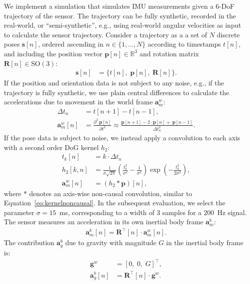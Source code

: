 \documentclass[journal]{IEEEtran}
\renewcommand{\vec}[1]{\boldsymbol{#1}}
\begin{document}
We implement a simulation that simulates IMU measurements given a 6-DoF trajectory of the sensor.
The trajectory can be fully synthetic, recorded in the real-world, or ``semi-synthetic'', e.g., using real-world angular velocities as input to calculate the sensor trajectory.   
Consider a trajectory as a a set of $N$ discrete poses $\vec{s}[n]$, ordered ascending in $n \in \lbrace 1,\dots,N \rbrace$ according to timestamps $t[n]$, and including the position vector $\vec{p}[n] \in \mathbb{R}^3$ and rotation matrix $\mathbf{R}[n] \in \text{SO}(3)$:
\begin{align}
\mathbf{s}[n] &= \lbrace t[n],\; \vec{p}[n],\; \mathbf{R}[n] \rbrace.
\end{align}
If the position and orientation data is not subject to any noise, e.g., if the trajectory is fully synthetic, we use plain central differences to calculate the accelerations due to movement in the world frame $\vec{a}_{m}^{w}$:
\begin{align}
  \Delta t_n &= t[n+1] - t[n-1], \\
  \vec{a}^w_m[n] &= \frac{\partial^2\,\vec{p}[n]}{\partial t^2} \approx \frac{\vec{p}[n+1] - 2 \cdot \vec{p}[n] +\; \vec{p}[n-1]}{\Delta t_{n}^2}.
\end{align}
If the pose data is subject to noise, we instead apply a convolution to each axis with a second order DoG kernel $h_2$:
\begin{align}
t_k[n] &= k \cdot \Delta t_n \\
h_2[k, n] &= \frac{1}{\sigma \sqrt{2\pi}} \left( \frac{t_k^2}{\sigma^4} - \frac{1}{\sigma^2} \right) \exp\!\left( - \frac{t_k^2}{2\sigma^2} \right), \\
\vec{a}^w_{m}[n] &= (h_2 * \vec{p})[n], \label{eq:awm}
\end{align}
where $*$ denotes an axis-wise non-causal convolution, similar to Equation~\eqref{eq:kernelnoncausal}.
In the subsequent evaluation, we select the parameter $\sigma = 15$~ms, corresponding to a width of 3 samples for a $200$~Hz signal.  
The sensor measures an acceleration in its own inertial body frame $\vec{a}_m^b$:
\begin{align}
\vec{a}^{b}_{m}[n] = \vec{R}^{\top}\![n] \cdot \vec{a}^{w}_m[n].\label{eq:abm}
\end{align}
The contribution $\vec{a}^b_g$ due to gravity with magnitude $G$ in the inertial body frame is:
\begin{align}
\vec{g}^{w} &= [0,\;0,\;G]^\top,\\
\vec{a}^{b}_{g}[n] &= \vec{R}^{\top}\![n]\cdot\vec{g}^{w}.\label{eq:abg}
\end{align}
\end{document}
